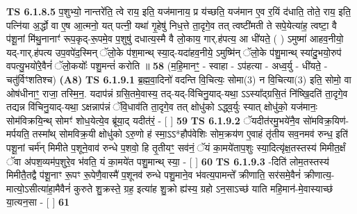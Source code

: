 \documentclass[17pt]{extarticle}
\begin{document}
                  \newline
                                \textbf{ TS 6.1.8.5} \newline
                  प॒शुभ्यो॒ नान्तरे॑ति॒ त्वे राय॒ इति॒ यज॑मानाय॒ प्र य॑च्छति॒ यज॑मान ए॒व र॒यिं द॑धाति॒ तोते॒ राय॒ इति॒ पत्नि॑या अ॒र्द्धो वा ए॒ष आ॒त्मनो॒ यत् पत्नी॒ यथा॑ गृ॒हेषु॑ निध॒त्ते ता॒दृगे॒व तत् त्वष्टी॑मती ते सपे॒येत्या॑ह॒ त्वष्टा॒ वै प॑शू॒नां मि॑थु॒नानाꣳ॑ रूप॒कृद्-रू॒पमे॒व प॒शुषु॑ दधात्य॒स्मै वै लो॒काय॒ गार्.ह॑पत्य॒ आ धी॑यते॒ ( ) ऽमुष्मा॑ आहव॒नीयो॒ यद्-गार्.ह॑पत्य उप॒वपे॑द॒स्मिन् ॅलो॒के प॑श॒मान्थ् स्या॒द्-यदा॑हव॒नीये॒ ऽमुष्मि॑न् ॅलो॒के प॑शु॒मान्थ् स्या॑दु॒भयो॒रुप॑ वपत्यु॒भयो॑रे॒वैनं॑ ॅलो॒कयोः᳚ पशु॒मन्तं॑ करोति ॥ \textbf{  58} \newline
                  \newline
                      (म॒हि॒मानꣳ॒॒ - स्वाहा - ऽप॑हत्या - अध्व॒र्यु - धी॑यते॒ - चतु॑र्विꣳशतिश्च)  \textbf{(A8)} \newline \newline
                                        \textbf{ TS 6.1.9.1} \newline
                  ब्र॒ह्म॒वा॒दिनो॑ वदन्ति वि॒चित्यः॒ सोमा(3) न वि॒चित्या(3) इति॒ सोमो॒ वा ओष॑धीनाꣳ॒॒ राजा॒ तस्मि॒न॒. यदाप॑न्नं ग्रसि॒तमे॒वास्य॒ तद्-यद्-वि॑चिनु॒याद्-यथा॒ ऽऽस्या᳚द्ग्रसि॒तं नि॑ष्खि॒दति॑ ता॒दृगे॒व तद्यन्न वि॑चिनु॒याद्-यथा॒ ऽक्षन्नाप॑न्नं ॅवि॒धाव॑ति ता॒दृगे॒व तत् क्षोधु॑को ऽद्ध्व॒र्युः स्यात् क्षोधु॑को॒ यज॑मानः॒ सोम॑विक्रयि॒न्थ् सोमꣳ॑ शोध॒येत्ये॒व ब्रू॑या॒द् यदीत॑रं॒ - [  ] \textbf{  59} \newline
                  \newline
                                \textbf{ TS 6.1.9.2} \newline
                  ॅयदीत॑रमु॒भये॑नै॒व सो॑मविक्र॒यिण॑-मर्पयति॒ तस्मा᳚थ् सोमविक्र॒यी क्षोधु॑को ऽरु॒णो ह॑ स्मा॒ऽऽ*हौप॑वेशिः सोम॒क्रय॑ण ए॒वाहं तृ॑तीय सव॒नमव॑ रुन्ध॒ इति॑ पशू॒नां चर्म॑न् मिमीते प॒शूने॒वाव॑ रुन्धे प॒शवो॒ हि तृ॒तीयꣳ॒॒ सव॑नं॒ ॅयं का॒मये॑ताप॒शुः स्या॒दित्यृ॑क्ष॒तस्तस्य॑ मिमीत॒र्क्षं ॅवा अ॑पश॒व्यम॑प॒शुरे॒व भ॑वति॒ यं का॒मये॑त पशु॒मान्थ् स्या॒ - [  ] \textbf{  60} \newline
                  \newline
                                \textbf{ TS 6.1.9.3} \newline
                  -दिति॑ लोम॒तस्तस्य॑ मिमीतै॒तद्वै प॑शू॒नाꣳ रू॒पꣳ रू॒पेणै॒वास्मै॑ प॒शूनव॑ रुन्धे पशु॒माने॒व भ॑वत्य॒पामन्ते᳚ क्रीणाति॒ सर॑समे॒वैनं॑ क्रीणात्य॒-मात्यो॒ऽसीत्या॑हा॒मैवैनं॑ कुरुते शु॒क्रस्ते॒ ग्रह॒ इत्या॑ह शु॒क्रो ह्य॑स्य॒ ग्रहो ऽन॒साऽच्छ॑ याति महि॒मान॑-मे॒वास्याच्छ॑ या॒त्यन॒सा - [  ] \textbf{  61} \newline
\end{document}
